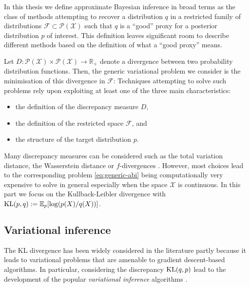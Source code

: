 
In this thesis we define approximate Bayesian inference in broad terms as the class of methods attempting to recover a distribution $q$ in a restricted family of distributions $\mathcal F\subset \mathcal P(\mathcal X)$ such that $q$ is a ``good'' proxy for a posterior distribution $p$ of interest. 
This definition leaves significant room to describe different methods based on the definition of what a ``good proxy'' means. 

Let $D:\mathcal P(\mathcal X)\times \mathcal P(\mathcal X)\to \mathbb R_{+}$ denote a divergence between two probability distribution functions. Then, the generic variational problem we consider is the minimisation of this divergence in $\mathcal F$:
%
%
Techniques attempting to solve such problems rely upon exploiting at least one of the three main characteristics: 
\begin{itemize}\itsepa
\item the definition of the discrepancy measure $D$, 
\item the definition of the restricted space $\mathcal F$, and
\item the structure of the target distribution $p$. 
\end{itemize}
Many discrepancy measures can be considered such as the total variation distance, the Wasserstein distance or $f$-divergences \citep{minka04, blei16, li16, bernton17}. However, most choices lead to the corresponding problem \eqref{eq:generic-abi} being computationally very expensive to solve in general especially when the space $\mathcal X$ is continuous. In this part we focus on the Kullback-Leibler divergence \citep{kullback51} with $\mathrm{KL}\!\left(p,q\right):=\mathbb E_{p}[\log (p(X)/q(X))]$.

\subsection{Variational inference}
The KL divergence has been widely considered in the literature partly because it leads to variational problems that are amenable to gradient descent-based algorithms. 
In particular, considering the discrepancy $\mathrm{KL}\!\left(q,p\right)$ lead to the development of the popular \emph{variational inference} algorithms \citep{hoffman13,blei16}. 

